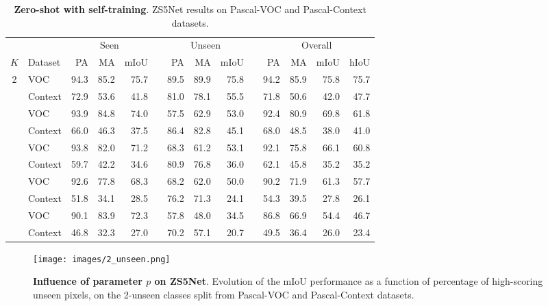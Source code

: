 \documentclass{article}
\begin{document}
\begin{table}
	\caption{\small \textbf{Zero-shot with self-training}. ZS5Net results on Pascal-VOC and Pascal-Context datasets.\vspace{3pt}}
	\small{
		\begin{tabular}{clrrrrrrrrrrrr} \toprule
			&                & \multicolumn{3}{c}{Seen} && \multicolumn{3}{c}{Unseen}  && \multicolumn{4}{c}{Overall}     \\ \cline{3-5} \cline{7-9} \cline{11-14}\noalign{\smallskip}
			$K$ & Dataset           & PA    & MA    & mIoU  &&  PA    & MA    & mIoU && PA    &  MA     & mIoU  &  hIoU\\ \midrule[1.1pt] 
			\multirow{2}{*}{2}
			& VOC & 94.3   & 85.2   & 75.7  && 89.5 & 89.9  & 75.8  &&  94.2  & 85.9   & 75.8  & 75.7  \\
			& Context &  72.9  & 53.6  & 41.8 &&  81.0  & 78.1 & 55.5 && 71.8   & 50.6  & 42.0  & 47.7\\ \hline\noalign{\smallskip}
			\multirow{2}{*}{4} 
			 & VOC & 93.9 & 84.8 & 74.0 && 57.5 & 62.9  & 53.0 && 92.4  & 80.9  & 69.8 & 61.8 \\ 
		
				& Context &  66.0 & 46.3   & 37.5 &&  86.4 & 82.8   & 45.1 && 68.0    & 48.5   & 38.0 & 41.0\\ 
			\hline\noalign{\smallskip}
			\multirow{2}{*}{6} 
			& VOC & 93.8 & 82.0 & 71.2 && 68.3 & 61.2  & 53.1  &&  92.1 &  75.8 & 66.1 &  60.8\\ 
			& Context & 59.7  &  42.2 & 34.6 && 80.9 & 76.8 & 36.0 && 62.1 & 45.8 & 35.2 & 35.2 \\\hline\noalign{\smallskip}
			\multirow{2}{*}{8} 
			 & VOC & 92.6 & 77.8 & 68.3 && 68.2 & 62.0  & 50.0 &&  90.2 &  71.9 & 61.3 & 57.7 \\ 
			& Context &  51.8 & 34.1   & 28.5 && 76.2  &71.3 & 24.1 && 54.3    & 39.5   & 27.8  & 26.1 \\
			\hline\noalign{\smallskip}
			\multirow{2}{*}{10} 
			&  VOC & 90.1 & 83.9 & 72.3 && 57.8 & 48.0 & 34.5 &&  86.8 &  66.9 & 54.4 & 46.7 \\ 
			& Context  &  46.8  & 32.3 & 27.0  &&  70.2  & 57.1  & 20.7 && 49.5   & 36.4   & 26.0  & 23.4 \\ 
			\bottomrule
		\end{tabular}
	}
	\label{self_training}
\end{table}


\begin{SCfigure}[50][ht]
\centering
\texttt{[image: images/2\_unseen.png]}
\caption{\small \textbf{Influence of parameter $p$ on ZS5Net}.  Evolution of the mIoU performance as a function of percentage of high-scoring unseen pixels, on the 2-unseen classes split from Pascal-VOC and Pascal-Context datasets.}
\vspace{-0.5cm}
\label{self_p}
\end{SCfigure}
\end{document}
